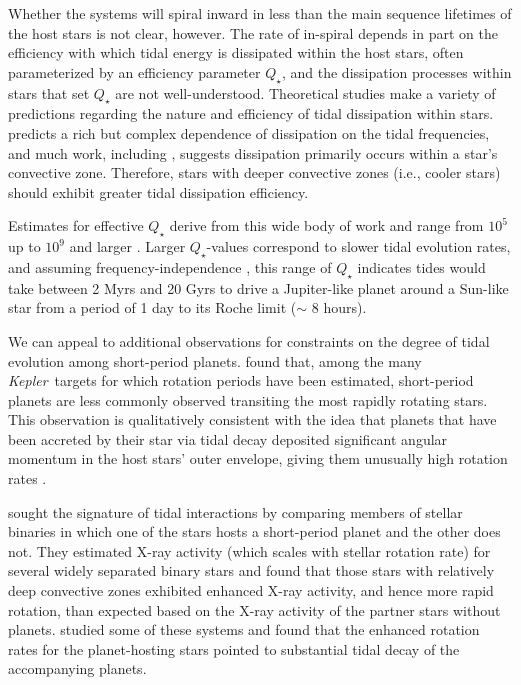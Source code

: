 \documentclass{svjour3}                     %
\newcommand{\kepler}{\emph{Kepler}}
\begin{document}
Whether the systems will spiral inward in less than the main sequence lifetimes of the host stars is not clear, however. The rate of in-spiral depends in part on the efficiency with which tidal energy is dissipated within the host stars, often parameterized by an efficiency parameter $Q_\star$, and the dissipation processes within stars that set $Q_\star$ are not well-understood. Theoretical studies make a variety of predictions regarding the nature and efficiency of tidal dissipation within stars. \cite{2016ApJ...816...18E} predicts a rich but complex dependence of dissipation on the tidal frequencies, and much work, including \cite{2007ApJ...655.1166P}, suggests dissipation primarily occurs within a star's convective zone. Therefore, stars with deeper convective zones (i.e., cooler stars) should exhibit greater tidal dissipation efficiency. 

Estimates for effective $Q_\star$ derive from this wide body of work and range from $10^5$ \cite{1996Natur.380..606L,2016ApJ...816...18E} up to $10^9$ and larger \cite{2011ApJ...731...67P}. Larger $Q_\star$-values correspond to slower tidal evolution rates, and assuming frequency-independence \cite{1966Icar....5..375G}, this range of $Q_\star$ indicates tides would take between 2 Myrs and 20 Gyrs to drive a Jupiter-like planet around a Sun-like star from a period of 1 day to its Roche limit ($\sim$ 8 hours).

We can appeal to additional observations for constraints on the degree of tidal evolution among short-period planets. \cite{2013ApJ...775L..11M} found that, among the many \kepler\ targets for which rotation periods have been estimated, short-period planets are less commonly observed transiting the most rapidly rotating stars. This observation is qualitatively consistent with the idea that planets that have been accreted by their star via tidal decay deposited significant angular momentum in the host stars' outer envelope, giving them unusually high rotation rates \cite{2009ApJ...698.1357J}. 

\cite{2014A&A...565L...1P} sought the signature of tidal interactions by comparing members of stellar binaries in which one of the stars hosts a short-period planet and the other does not. They estimated X-ray activity (which scales with stellar rotation rate) for several widely separated binary stars and found that those stars with relatively deep convective zones exhibited enhanced X-ray activity, and hence more rapid rotation, than expected based on the X-ray activity of the partner stars without planets. \cite{2015ApJ...807...78F} studied some of these systems and found that the enhanced rotation rates for the planet-hosting stars pointed to substantial tidal decay of the accompanying planets. 
\end{document}
